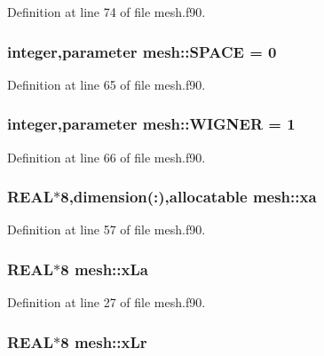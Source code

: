 Definition at line 74 of file mesh.f90.

\hypertarget{namespacemesh_a0c6bae5d6531a6b0f0428c0c056f759d}{
\subsubsection[{SPACE}]{\setlength{\rightskip}{0pt plus 5cm}integer,parameter {\bf mesh::SPACE} = 0}}
\label{namespacemesh_a0c6bae5d6531a6b0f0428c0c056f759d}


Definition at line 65 of file mesh.f90.

\hypertarget{namespacemesh_a4e989d120872f8573cf4454bfc6a0d31}{
\subsubsection[{WIGNER}]{\setlength{\rightskip}{0pt plus 5cm}integer,parameter {\bf mesh::WIGNER} = 1}}
\label{namespacemesh_a4e989d120872f8573cf4454bfc6a0d31}


Definition at line 66 of file mesh.f90.

\hypertarget{namespacemesh_af9469b274e48a8fcc34f1c8df7976271}{
\subsubsection[{xa}]{\setlength{\rightskip}{0pt plus 5cm}REAL$\ast$8,dimension(:),allocatable {\bf mesh::xa}}}
\label{namespacemesh_af9469b274e48a8fcc34f1c8df7976271}


Definition at line 57 of file mesh.f90.

\hypertarget{namespacemesh_a7b0412308700e4488efc480ace9412b8}{
\subsubsection[{xLa}]{\setlength{\rightskip}{0pt plus 5cm}REAL$\ast$8 {\bf mesh::xLa}}}
\label{namespacemesh_a7b0412308700e4488efc480ace9412b8}


Definition at line 27 of file mesh.f90.

\hypertarget{namespacemesh_a4ad69b5cc7ea5c0bd0f1f8d39fc3f604}{
\subsubsection[{xLr}]{\setlength{\rightskip}{0pt plus 5cm}REAL$\ast$8 {\bf mesh::xLr}}}
\label{namespacemesh_a4ad69b5cc7ea5c0bd0f1f8d39fc3f604}



